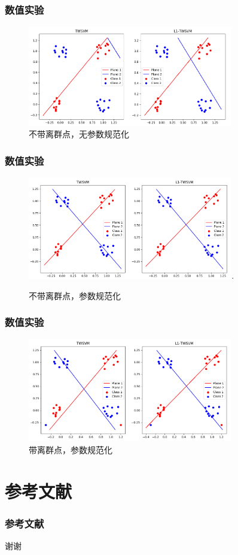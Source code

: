 \documentclass{beamer}
\begin{document}
\begin{frame}
\frametitle{数值实验}
\begin{figure}[ht]
\centering
\includegraphics[width=0.8\textwidth]{../img/without_norm_cons.png}
\caption{不带离群点，无参数规范化}
\label{no_out_no_reg}
\end{figure}
\end{frame}

\begin{frame}
\frametitle{数值实验}
\begin{figure}[ht]
\centering
\includegraphics[width=0.8\textwidth]{../img/without_outliers.png}.
\caption{不带离群点，参数规范化}
\label{no_out}
\end{figure}
\end{frame}

\begin{frame}
\frametitle{数值实验}
\begin{figure}[ht]
\centering
\includegraphics[width=0.8\textwidth]{../img/with_outliers.png}
\caption{带离群点，参数规范化}
\label{outliers}
\end{figure}
\end{frame}

\section{参考文献}
\begin{frame}[allowframebreaks]
\frametitle{参考文献}
\footnotesize{
\printbibliography
}
\end{frame}


\begin{frame}
\Huge{\centerline{谢谢}}
\end{frame}

\end{document}

